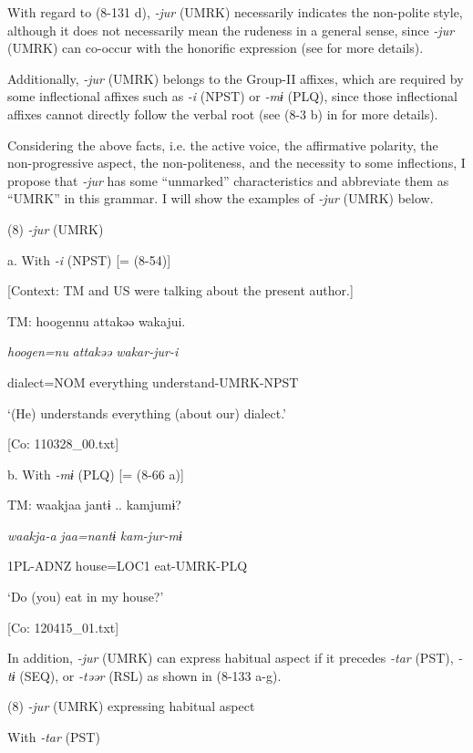 With regard to (8-131 d), \textit{{}-jur} (UMRK) necessarily indicates the non-polite style, although it does not necessarily mean the rudeness in a general sense, since \textit{{}-jur} (UMRK) can co-occur with the honorific expression (see  for more details).

Additionally, \textit{{}-jur} (UMRK) belongs to the Group-II affixes, which are required by some inflectional affixes such as \textit{{}-i} (NPST) or \textit{{}-mɨ} (PLQ), since those inflectional affixes cannot directly follow the verbal root (see (8-3 b) in  for more details).

  Considering the above facts, i.e. the active voice, the affirmative polarity, the non-progressive aspect, the non-politeness, and the necessity to some inflections, I propose that \textit{{}-jur} has some “unmarked” characteristics and abbreviate them as “UMRK” in this grammar. I will show the examples of \textit{{}-jur} (UMRK) below.

(8)  \textit{{}-jur} (UMRK)

  a. With \textit{{}-i} (NPST) [= (8-54)]

  [Context: TM and US were talking about the present author.]

  TM:  {\textbar}hoogen{\textbar}nu  attakəə  wakajui.

    \textit{hoogen=nu}  \textit{attakəə}  \textit{wakar-jur-i}

    dialect=NOM  everything  understand-UMRK-NPST

    ‘(He) understands everything (about our) dialect.’

    [Co: 110328\_00.txt]

  b. With \textit{{}-mɨ} (PLQ) [= (8-66 a)]

  TM:  waakjaa  jantɨ ..  kamjumɨ?

    \textit{waakja-a}  \textit{jaa=nantɨ}  \textit{kam-jur-mɨ}

    1PL-ADNZ  house=LOC1  eat-UMRK-PLQ

    ‘Do (you) eat in my house?’

    [Co: 120415\_01.txt]

  In addition, \textit{{}-jur} (UMRK) can express habitual aspect if it precedes \textit{{}-tar} (PST), \textit{{}-tɨ} (SEQ), or \textit{{}-təər} (RSL) as shown in (8-133 a-g).

(8)  \textit{{}-jur} (UMRK) expressing habitual aspect

  With \textit{{}-tar} (PST)

